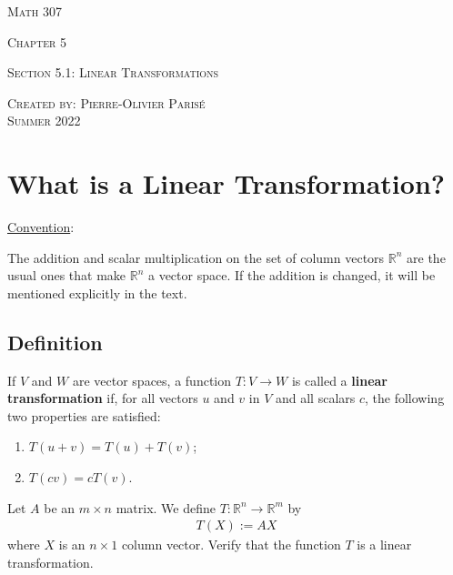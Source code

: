 \documentclass[12pt,a4paper]{article}
\newcounter{example}[section]
\begin{document}
\thispagestyle{empty}

\begin{center}
\vspace*{2.5cm}

{\Huge \textsc{Math 307}}

\vspace*{2cm}

{\LARGE \textsc{Chapter 5}} 

\vspace*{0.75cm}

\noindent\textsc{Section 5.1: Linear Transformations}

\vspace*{0.75cm}

\tableofcontents

\vfill

\noindent \textsc{Created by: Pierre-Olivier Paris{\'e}} \\
\textsc{Summer 2022}
\end{center}

\newpage

\section{What is a Linear Transformation?}
\underline{Convention}:

The addition and scalar multiplication on the set of column vectors $\mathbb{R}^n$ are the usual ones that make $\mathbb{R}^n$ a vector space. If the addition is changed, it will be mentioned explicitly in the text.

	\subsection{Definition}
	If $V$ and $W$ are vector spaces, a function $T : V \rightarrow W$ is called a \textbf{linear transformation} if, for all vectors $u$ and $v$ in $V$ and all scalars $c$, the following two properties are satisfied:
		\begin{enumerate}
		\item $T (u + v) = T(u) + T(v)$;
		\item $T(cv) = c T(v)$.
		\end{enumerate}
		
	\vspace*{12pt}

	\begin{example}
	Let $A$ be an $m \times n$ matrix. We define $T : \mathbb{R}^n \rightarrow \mathbb{R}^m$ by
		\begin{align*}
		T (X) := A X
		\end{align*}
	where $X$ is an $n \times 1$ column vector. Verify that the function $T$ is a linear transformation.
	\end{example}
	
\end{document}
